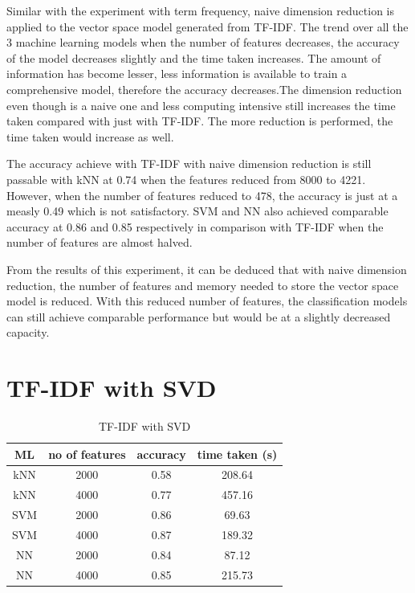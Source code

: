Similar with the experiment with term frequency, naive dimension reduction is applied to the vector space model generated from TF-IDF. The trend over all the 3 machine learning models when the number of features decreases, the accuracy of the model decreases slightly and the time taken increases. The amount of information has become lesser, less information is available to train a comprehensive model, therefore the accuracy decreases.The dimension reduction even though is a naive one and less computing intensive still increases the time taken compared with just with TF-IDF. The more reduction is performed, the time taken would increase as well.

The accuracy achieve with TF-IDF with naive dimension reduction is still passable with kNN at 0.74 when the features reduced from 8000 to 4221. However, when the number of features reduced to 478, the accuracy is just at a measly 0.49 which is not satisfactory. SVM and NN also achieved comparable accuracy at 0.86 and 0.85 respectively in comparison with TF-IDF when the number of features are almost halved.

From the results of this experiment, it can be deduced that with naive dimension reduction, the number of features and memory needed to store the vector space model is reduced. With this reduced number of features, the classification models can still achieve comparable performance but would be at a slightly decreased capacity.

\section{TF-IDF with SVD}

\begin{table} [ht]
	\centering
	\begin{tabular}{|| c | c | c | c||}
		\hline
		ML & no of features & accuracy & time taken (s) \\ [0.5ex]
		\hline\hline
		kNN & 2000 & 0.58 & 208.64 \\ 
		\hline
		kNN & 4000 & 0.77 & 457.16 \\
		\hline\hline
		SVM & 2000 & 0.86 & 69.63 \\
		\hline
		SVM & 4000 & 0.87 & 189.32 \\
		\hline\hline
		NN & 2000 & 0.84 & 87.12 \\
		\hline
		NN & 4000 & 0.85 & 215.73 \\
		\hline\hline
	\end{tabular}
\caption{TF-IDF with SVD}
\label{tbl:tfidfSvd}
\end{table}

